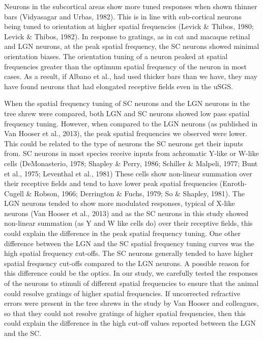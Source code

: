 	Neurons in the subcortical areas show more tuned responses when shown thinner bars (Vidyasagar and Urbas, 1982). This is in line with sub-cortical neurons being tuned to orientation at higher spatial frequencies (Levick \& Thibos, 1980; Levick \& Thibos, 1982). In response to gratings, as in cat and macaque retinal and LGN neurons, at the peak spatial frequency, the SC neurons showed minimal orientation biases. The orientation tuning of a neuron peaked at spatial frequencies greater than the optimum spatial frequency of the neuron in most cases. As a result, if Albano et al., had used thicker bars than we have, they may have found neurons that had elongated receptive fields even in the uSGS.
	
	When the spatial frequency tuning of SC neurons and the LGN neurons in the tree shrew were compared, both LGN and SC neurons showed low pass spatial frequency tuning. However, when compared to the LGN neurons (as published in Van Hooser et al., 2013), the peak spatial frequencies we observed were lower. This could be related to the type of neurons the SC neurons get their inputs from. SC neurons in most species receive inputs from achromatic Y-like or W-like cells (DeMonasterio, 1978; Shapley \& Perry, 1986; Schiller \& Malpeli, 1977; Bunt et al., 1975; Leventhal et al., 1981) These cells show non-linear summation over their receptive fields and tend to have lower peak spatial frequencies (Enroth-Cugell \& Robson, 1966; Derrington \& Fuchs, 1979; So \& Shapley, 1981). The LGN neurons tended to show more modulated responses, typical of X-like neurons (Van Hooser et al., 2013) and as the SC neurons in this study showed non-linear summation (as Y and W like cells do) over their receptive fields, this could explain the difference in the peak spatial frequency tuning. One other difference between the LGN and the SC spatial frequency tuning curves was the high spatial frequency cut-offs. The SC neurons generally tended to have higher spatial frequency cut-offs compared to the LGN neurons. A possible reason for this difference could be the optics. In our study, we carefully tested the responses of the neurons to stimuli of different spatial frequencies to ensure that the animal could resolve gratings of higher spatial frequencies. If uncorrected refractive errors were present in the tree shrews in the study by Van Hooser and colleagues, so that they could not resolve gratings of higher spatial frequencies, then this could explain the difference in the high cut-off values reported between the LGN and the SC.
	
